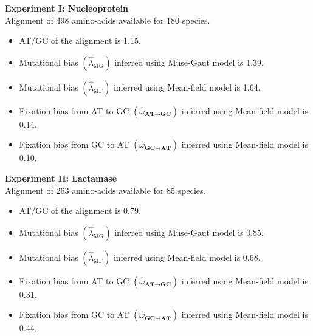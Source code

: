 \documentclass[8pt]{beamer}
\begin{document}
	\begin{frame}
	\textbf{Experiment I: Nucleoprotein}\\
	Alignment of 498 amino-acids available for 180 species.
	\begin{itemize}
		\item AT/GC of the alignment is 1.15.
		\item Mutational bias $\left({\widehat{\lambda}_{\text{MG}}} \right)$ inferred using Muse-Gaut model is 1.39.
		\item Mutational bias $\left({\widehat{\lambda}_{\text{MF}}} \right)$ inferred using Mean-field model is 1.64.
		\item Fixation bias from AT to GC $\left(\widehat{\omega}_{\textbf{AT} \rightarrow \textbf{GC}}\right)$ inferred using Mean-field model is 0.14.
		\item Fixation bias from GC to AT $\left(\widehat{\omega}_{\textbf{GC} \rightarrow \textbf{AT}}\right)$ inferred using Mean-field model is 0.10.
	\end{itemize}
	\vspace{0.3cm}
	\textbf{Experiment II: Lactamase}\\
	Alignment of 263 amino-acids available for 85 species.
	\begin{itemize}
		\item AT/GC of the alignment is 0.79.
		\item Mutational bias $\left({\widehat{\lambda}_{\text{MG}}} \right)$ inferred using Muse-Gaut model is 0.85.
		\item Mutational bias $\left({\widehat{\lambda}_{\text{MF}}} \right)$ inferred using Mean-field model is 0.68.
		\item Fixation bias from AT to GC $\left(\widehat{\omega}_{\textbf{AT} \rightarrow \textbf{GC}}\right)$ inferred using Mean-field model is 0.31.
		\item Fixation bias from GC to AT $\left(\widehat{\omega}_{\textbf{GC} \rightarrow \textbf{AT}}\right)$ inferred using Mean-field model is 0.44.
	\end{itemize}
	\end{frame}
	
\end{document}
